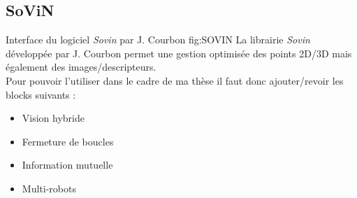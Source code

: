 \subsection{SoViN}


        {Interface du logiciel \emph{Sovin} par J. Courbon}
      {fig:SOVIN}       
        La librairie \emph{Sovin} développée par J. Courbon permet une gestion optimisée des points 2D/3D mais également des images/descripteurs.\\
        Pour pouvoir l'utiliser dans le cadre de ma thèse il faut donc ajouter/revoir les blocks suivants :
        \begin{itemize}
        \item Vision hybride
        \item Fermeture de boucles
        \item Information mutuelle
        \item Multi-robots
        \end{itemize}